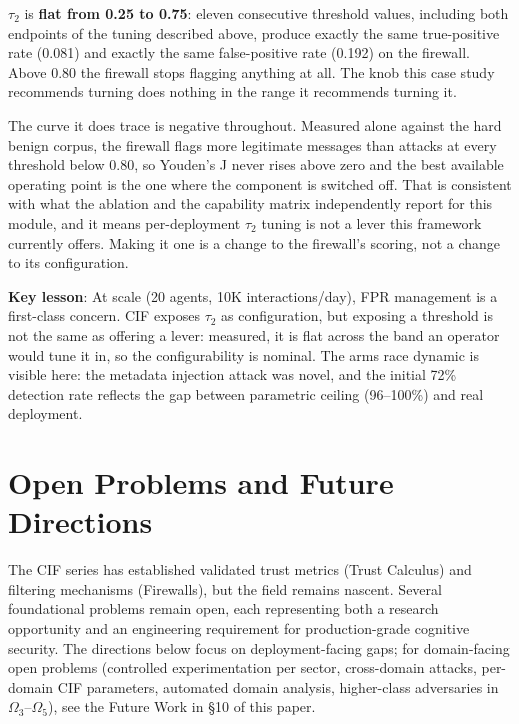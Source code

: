 \documentclass[
]{article}
\begin{document}
\(\tau_2\) is \textbf{flat from 0.25 to 0.75}: eleven consecutive
threshold values, including both endpoints of the tuning described
above, produce exactly the same true-positive rate (0.081) and exactly
the same false-positive rate (0.192) on the firewall. Above 0.80 the
firewall stops flagging anything at all. The knob this case study
recommends turning does nothing in the range it recommends turning it.

The curve it does trace is negative throughout. Measured alone against
the hard benign corpus, the firewall flags more legitimate messages than
attacks at every threshold below 0.80, so Youden's J never rises above
zero and the best available operating point is the one where the
component is switched off. That is consistent with what the ablation and
the capability matrix independently report for this module, and it means
per-deployment \(\tau_2\) tuning is not a lever this framework currently
offers. Making it one is a change to the firewall's scoring, not a
change to its configuration.

\textbf{Key lesson}: At scale (20 agents, 10K interactions/day), FPR
management is a first-class concern. CIF exposes \(\tau_2\) as
configuration, but exposing a threshold is not the same as offering a
lever: measured, it is flat across the band an operator would tune it
in, so the configurability is nominal. The arms race dynamic is visible
here: the metadata injection attack was novel, and the initial 72\%
detection rate reflects the gap between parametric ceiling (96--100\%)
and real deployment.

\newpage

\newpage

\section{Open Problems and Future Directions}\label{sec:future}

The CIF series has established validated trust metrics (Trust Calculus)
and filtering mechanisms (Firewalls), but the field remains nascent.
Several foundational problems remain open, each representing both a
research opportunity and an engineering requirement for production-grade
cognitive security. The directions below focus on deployment-facing
gaps; for domain-facing open problems (controlled experimentation per
sector, cross-domain attacks, per-domain CIF parameters, automated
domain analysis, higher-class adversaries in
\(\Omega_3\)--\(\Omega_5\)), see the Future Work in §10 of this paper.
\end{document}
